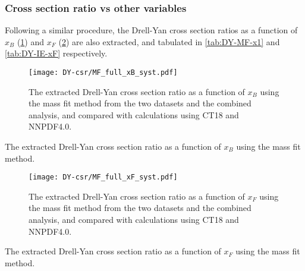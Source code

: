 \documentclass[../main.tex]{subfiles}
\begin{document}
\subsubsection{Cross section ratio vs other variables}
Following a similar procedure, the Drell-Yan cross section ratios as a function of $x_B$ (\cref{fig:CSR_MF_xB})
and $x_F$ (\cref{fig:CSR_MF_xF}) are also extracted, and tabulated in \cref{tab:DY-MF-x1} and \cref{tab:DY-IE-xF} respectively.
\begin{figure}[htpb!]
	\centering
	\texttt{[image: DY-csr/MF\_full\_xB\_syst.pdf]}
	\caption{The extracted Drell-Yan cross section ratio as a function of $x_B$
		using the mass fit method from the two datasets and the combined analysis,
		and compared with calculations using CT18 and NNPDF4.0.}
	\label{fig:CSR_MF_xB}
\end{figure}
\begin{table}[htpb!]
	\centering
	\caption{The extracted Drell-Yan cross section ratio as a function of $x_B$ using the mass fit method.}
	\label{tab:DY-MF-x1}
	
\end{table}
\begin{figure}[htpb!]
	\centering
	\texttt{[image: DY-csr/MF\_full\_xF\_syst.pdf]}
	\caption{The extracted Drell-Yan cross section ratio as a function of $x_F$
		using the mass fit method from the two datasets and the combined analysis,
		and compared with calculations using CT18 and NNPDF4.0.}
	\label{fig:CSR_MF_xF}
\end{figure}
\begin{table}[htpb!]
	\centering
	\caption{The extracted Drell-Yan cross section ratio as a function of $x_F$ using the mass fit method.}
	\label{tab:DY-MF-xF}
	
\end{table}
\FloatBarrier
\end{document}
